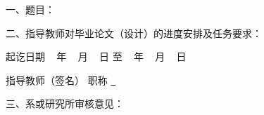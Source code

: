 % 		


{


{
	\bfseries {}
	\noindent \par
	\noindent \par 一、题目：\Title \
	\noindent \par 二、指导教师对毕业论文（设计）的进度安排及任务要求：

}
{
}
{
	\bfseries {}
	\noindent \par 起讫日期 ~ 年 ~  月 ~  日 \quad 至 \quad ~  年 ~  月  ~ 日
	
    \begin{flushright}
		指导教师（签名） \underline{{\quad}\AdvisorName{\quad}} 职称 \underline{{\quad}~{\quad}}
	\end{flushright}
}
{
    \bfseries {}
    \noindent \par 三、系或研究所审核意见：

}
{
}
{
\mbox{} \vfill
\bfseries{\signature{负责人（签名）}}
}
}
